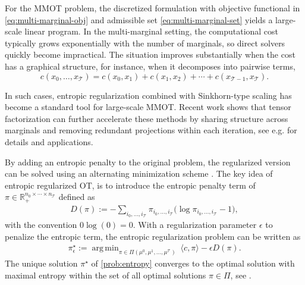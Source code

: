\documentclass[11pt]{article}
\newcommand{\calT}{{\mathcal T}}
\DeclareMathOperator*{\argmin}{arg\,min}
\begin{document}
For the MMOT problem, the discretized formulation with objective functional in \eqref{eq:multi-marginal-obj} and admissible set \eqref{eq:multi-marginal-set} yields a large-scale linear program. In the multi-marginal setting, the computational cost typically grows exponentially with the number of marginals, so direct solvers quickly become impractical. The situation improves substantially when the cost has a graphical structure, for instance, when it decomposes into pairwise terms,
$$
c(x_0,\dots,x_\calT)
= c(x_0,x_1)+c(x_1,x_2)+\dotsb+c(x_{\calT-1},x_\calT).
$$


In such cases, entropic regularization combined with Sinkhorn-type scaling has become a standard tool for large-scale MMOT. Recent work shows that tensor factorization can further accelerate these methods by sharing structure across marginals and removing redundant projections within each iteration, see e.g. \cite{elvander2020multi,haasler2021multimarginal,haasler2024scalable} for details and applications.

By adding an entropic penalty to the original problem, the regularized version can be solved using an alternating minimization scheme \cite{peyre2019computational}. The key idea of entropic regularized OT, is to introduce the entropic penalty term of $\pi \in \mathbb{R}_+^{n_0\times\cdots\times n_\calT}$ defined as 
\begin{align}\label{eq:entropic-term}
    D(\pi):= - \sum_{i_0,\dots,i_\calT} \pi_{i_0,\dots,i_\calT}\Big(\log \pi_{i_0,\dots,i_\calT}-1\Big),
\end{align}
with the convention $0 \log(0) = 0$. With a regularization parameter $\epsilon$ to penalize the entropic term, the entropic regularization problem can be written as
\begin{align}\label{prob:entropy}
\pi_\epsilon^\star:=   \argmin_{\pi \in \Pi(\mu^0,\mu^1,\dots,\mu^\calT)} \ \langle c,\pi \rangle - \epsilon D(\pi).
\end{align}
The unique solution $\pi^\star$ of \eqref{prob:entropy} converges to the optimal solution with maximal entropy within the set of all optimal solutions $\pi\in\Pi$, see \cite[Proposition 4.1]{peyre2019computational}. 
\end{document}

